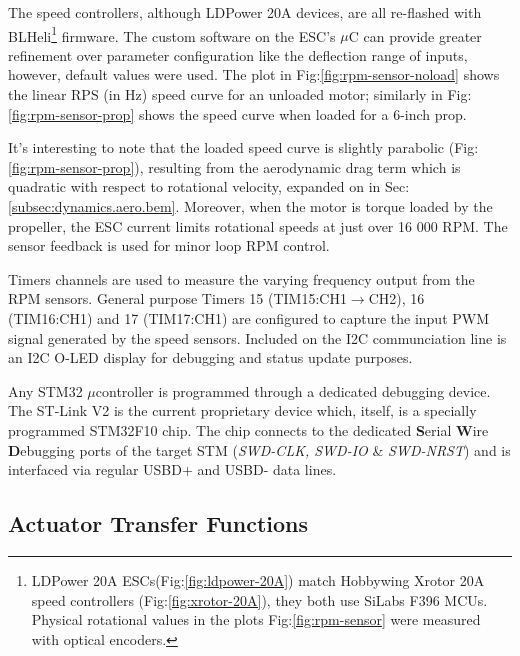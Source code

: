 The speed controllers, although LDPower 20A devices, are all re-flashed with BLHeli\footnote{LDPower 20A ESCs(Fig:\ref{fig:ldpower-20A}) match Hobbywing Xrotor 20A speed controllers (Fig:\ref{fig:xrotor-20A}), they both use SiLabs F396 MCUs. Physical rotational values in the plots Fig:\ref{fig:rpm-sensor} were measured with optical encoders.}\cite{BLHeli} firmware. The custom software on the ESC's $\mu$C can provide greater refinement over parameter configuration like the deflection range of inputs, however, default values were used. The plot in Fig:\ref{fig:rpm-sensor-noload} shows the linear RPS (in Hz) speed curve for an unloaded motor; similarly in Fig:\ref{fig:rpm-sensor-prop} shows the speed curve when loaded for a 6-inch prop. 
\par
It's interesting to note that the loaded speed curve is slightly parabolic (Fig:\ref{fig:rpm-sensor-prop}), resulting from the aerodynamic drag term which is quadratic with respect to rotational velocity, expanded on in Sec:\ref{subsec:dynamics.aero.bem}. Moreover, when the motor is torque loaded by the propeller, the ESC current limits rotational speeds at just over 16 000 RPM. The sensor feedback is used for minor loop RPM control.
\par
Timers channels are used to measure the varying frequency output from the RPM sensors. General purpose Timers 15 (TIM15:CH1$\rightarrow$CH2), 16 (TIM16:CH1) and 17 (TIM17:CH1) are configured to capture the input PWM signal generated by the speed sensors. Included on the I2C communciation line is an I2C O-LED display for debugging and status update purposes.
\par
Any STM32 $\mu$controller is programmed through a dedicated debugging device. The ST-Link V2\cite{st-link} is the current proprietary device which, itself, is a specially programmed STM32F10 chip. The chip connects to the dedicated \textbf{S}erial \textbf{W}ire \textbf{D}ebugging ports of the target STM (\emph{SWD-CLK, SWD-IO} \& \emph{SWD-NRST}) and is interfaced via regular USBD+ and USBD- data lines. 
\subsection{Actuator Transfer Functions}
\label{subsec:proto.design.transfer}

